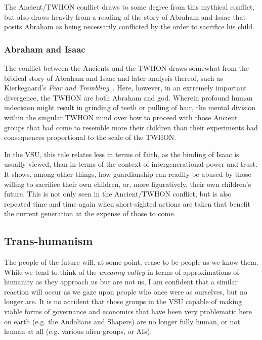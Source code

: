 The Ancient/TWHON conflict draws to some degree from this mythical
conflict, but also draws heavily from a reading of the story of
Abraham and Isaac that posits Abraham as being necessarily conflicted
by the order to sacrifice his child.

\subsubsection{Abraham and Isaac}

The conflict between the Ancients and the TWHON draws somewhat from
the biblical story of Abraham and Isaac and later analysis thereof,
such as Kierkegaard's \emph{Fear and
Trembling}~\cite{KierkegaardFearandTrembling}. Here, however, in an
extremely important divergence, the TWHON are both Abraham and
god. Wherein profound human indecision might result in grinding of
teeth or pulling of hair, the mental division within the singular
TWHON mind over how to proceed with those Ancient groups that had
come to resemble more their children than their experiments had
consequences proportional to the scale of the TWHON.

In the VSU, this tale relates less in terms of faith, as the binding
of Isaac is usually viewed, than in terms of the context of
intergenerational power and trust. It shows, among other things, how
guardianship can readily be abused by those willing to sacrifice their
own children, or, more figuratively, their own children's future. This
is not only seen in the Ancient/TWHON conflict, but is also repeated
time and time again when short-sighted actions are taken that benefit
the current generation at the expense of those to come.

\subsection{Trans-humanism}

The people of the future will, at some point, cease to be people as we
know them. While we tend to think of the {\em uncanny valley} in terms
of approximations of humanity as they approach us but are not us, I am
confident that a similar reaction will occur as we gaze upon people
who once were as ourselves, but no longer are. It is no accident that
those groups in the VSU capable of making viable forms of governance and economics that have been very problematic here on earth (e.g. the
Andolians and Shapers) are no longer fully human, or not human at all
(e.g. various alien groups, or AIs).

